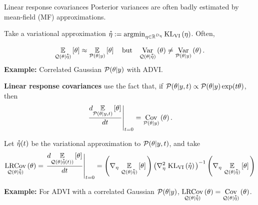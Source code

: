 \documentclass[8pt]{beamer}\usepackage[]{graphicx}\usepackage[]{color}
\begin{document}
\begin{frame}{Linear response covariances}
    Posterior variances are often badly estimated by mean-field (MF) approximations.
    
    Take a variational approximation 
    $\accentset{*}{\eta} := \operatorname*{\mathrm{argmin}}_{\eta \in \mathbb{R}^{D_{\eta}}} \mathrm{KL}_{\mathrm{VI}}\left(\eta\right)$.  Often,
    
    \begin{align}\label{eq:mfvb_conceit}
        \underset{\mathcal{Q}(\theta \vert \accentset{*}{\eta})}{\mathbb{E}}\left[\theta\right] \approx
        \underset{\mathcal{P}(\theta \vert y)}{\mathbb{E}}\left[\theta\right] \quad\textrm{but}\quad
        \underset{\mathcal{Q}(\theta \vert \accentset{*}{\eta})}{\mathrm{Var}}\left(\theta\right) \ne
        \underset{\mathcal{P}(\theta \vert y)}{\mathrm{Var}}\left(\theta\right).
    \end{align}    
    \textbf{Example: }Correlated Gaussian $\mathcal{P}(\theta \vert y)$ with ADVI.
    
    \hrulefill
    
    \textbf{Linear response covariances} use the fact that, if
    $\mathcal{P}(\theta \vert y, t) \propto \mathcal{P}(\theta \vert y) \exp(t \theta)$, then
    \begin{align}\label{eq:deriv_is_cov}
        \left. \frac{d \underset{\mathcal{P}(\theta \vert y, t)}{\mathbb{E}}\left[\theta\right]}{dt} \right|_{t=0} = \underset{\mathcal{P}(\theta \vert y)}{\mathrm{Cov}}\left(\theta\right).
    \end{align}
    
    Let $\accentset{*}{\eta}(t)$ be the variational approximation to $\mathcal{P}(\theta \vert y, t)$, and
    take
    \begin{align*}
        \underset{\mathcal{Q}(\theta \vert \accentset{*}{\eta})}{\mathrm{LRCov}}\left(\theta\right)
        =
        \left. \frac{d \underset{\mathcal{Q}(\theta \vert \accentset{*}{\eta}(t))}{\mathbb{E}}\left[\theta\right]}{dt} \right|_{t=0}
        =
        \left( \nabla_{\eta} \left. \underset{\mathcal{Q}(\theta \vert \accentset{*}{\eta})}{\mathbb{E}}\left[\theta\right] \right.\right)
        \left(\nabla^2_{\eta} \left. \mathrm{KL}_{\mathrm{VI}}\left(\accentset{*}{\eta}\right) \right. \right)^{-1}
        \left( \nabla_{\eta} \left. \underset{\mathcal{Q}(\theta \vert \accentset{*}{\eta})}{\mathbb{E}}\left[\theta\right] \right.\right)
    \end{align*}
    
    \textbf{Example: } For ADVI with a correlated Gaussian $\mathcal{P}(\theta \vert y)$,
    $\underset{\mathcal{Q}(\theta \vert \accentset{*}{\eta})}{\mathrm{LRCov}}\left(\theta\right)  = \underset{\mathcal{Q}(\theta \vert \accentset{*}{\eta})}{\mathrm{Cov}}\left(\theta\right)$.
    
    
\end{frame}
\end{document}
